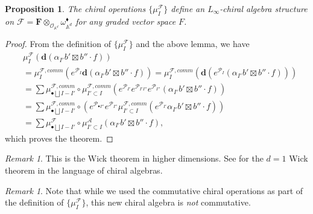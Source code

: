 \documentclass[11pt]{amsart}
\newtheorem{prop}[thm]{Proposition}
\theoremstyle{definition}
\theoremstyle{remark}
\newtheorem{rem}[thm]{Remark}
\numberwithin{equation}{section}
\begin{document}
\begin{prop}
    The chiral operations $\{\mu^{\mathcal{F}}_{{I}}\}$ define an $L_{\infty}$-chiral algebra structure on $\mathcal{F}
    =\mathbf{F}\otimes_{\mathcal{O}_{\mathbb{A}^d}} \omega_{\mathbb{A}^d}^{\blacklozenge}$ for any graded vector space
    $F$.
\end{prop}
\begin{proof}
From the definition of  $\{\mu^{\mathcal{F}}_{{I}}\}$ and the above lemma, we have
\begin{align*}
&\mu^{\mathcal{F}}_{{I}}\left(\mathbf{d}(\alpha_{{I'}}b'\boxtimes b''\cdot f)\right)\\
&=\mu^{\mathcal{F},comm}_{{I}}\left(e^{{\mathcal{P}}_{{I}}}\mathbf{d}(\alpha_{{I'}}b'\boxtimes b''\cdot f)\right)
=\mu^{\mathcal{F},comm}_{{I}}\left(\mathbf{d}(e^{{\mathcal{P}}_{{I}}}(\alpha_{{I'}}b'\boxtimes b''\cdot f))\right)\\
&=\sum \mu^{\mathcal{F},comm}_{\bullet\bigsqcup {I}-{I'}}\circ \mu^{\mathcal{F},comm}_{{I'}\subset{I}}\left(e^{{\mathcal{P}}_{{I'}}}e^{{\mathcal{P}}_{{I'}{I''}}}e^{{\mathcal{P}}_{{I''}}}(\alpha_{{I'}}b'\boxtimes b''\cdot f) \right)\\
&=\sum \mu^{\mathcal{F},comm}_{\bullet\bigsqcup {I}-{I'}}\circ \left(e^{{\mathcal{P}}_{\bullet{I''}}}e^{{\mathcal{P}}
_{{I''}}} \mu^{\mathcal{F},comm}_{{I'}\subset {I}}(e^{{\mathcal{P}}_{{I'}}}\alpha_{{I'}}b'\boxtimes b''\cdot f)\right)\\
&=\sum \mu^{\mathcal{F}}_{\bullet\bigsqcup{I}-{I'}}\circ \mu^{\mathcal{A}}_{{I'}\subset {I}}\left(\alpha_{{I'}}b'\boxtimes b''\cdot f\right),
\end{align*}
which proves the theorem.
 \end{proof}
\begin{rem}
  This is the Wick theorem in higher dimensions. See \cite{gui2023} for the $d=1$ Wick theorem in the language of chiral algebras.    
\end{rem}
\begin{rem}
  Note that while we used the commutative chiral operations as part of the definition of $\{\mu_I^{\mathcal{F}}\}$,
  this new chiral algebra is \textit{not} commutative.
\end{rem}
\end{document}
